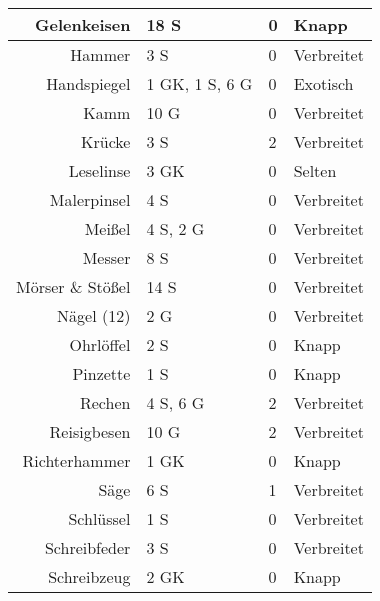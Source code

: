 \documentclass[a4paper, fontsize=9pt]{scrartcl}
\begin{document}
\begin{table}[ht!]
\begin{minipage}[c][\textheight][t]{.5\linewidth}
\begin{tabularx}{0.95\linewidth}{Rlll}
            Gelenkeisen         & 18 S           & 0           & Knapp               \\ \hline
            Hammer              & 3 S            & 0           & Verbreitet          \\ \hline
            Handspiegel         & 1 GK, 1 S, 6 G & 0           & Exotisch            \\ \hline
            Kamm                & 10 G           & 0           & Verbreitet          \\ \hline
            Krücke              & 3 S            & 2           & Verbreitet          \\ \hline
            Leselinse           & 3 GK           & 0           & Selten              \\ \hline
            Malerpinsel         & 4 S            & 0           & Verbreitet          \\ \hline
            Meißel              & 4 S, 2 G       & 0           & Verbreitet          \\ \hline
            Messer              & 8 S            & 0           & Verbreitet          \\ \hline
            Mörser \& Stößel    & 14 S           & 0           & Verbreitet          \\ \hline
            Nägel (12)          & 2 G            & 0           & Verbreitet          \\ \hline
            Ohrlöffel           & 2 S            & 0           & Knapp               \\ \hline
            Pinzette            & 1 S            & 0           & Knapp               \\ \hline
            Rechen              & 4 S, 6 G       & 2           & Verbreitet          \\ \hline
            Reisigbesen         & 10 G           & 2           & Verbreitet          \\ \hline
            Richterhammer       & 1 GK           & 0           & Knapp               \\ \hline
            Säge                & 6 S            & 1           & Verbreitet          \\ \hline
            Schlüssel           & 1 S            & 0           & Verbreitet          \\ \hline
            Schreibfeder        & 3 S            & 0           & Verbreitet          \\ \hline
            Schreibzeug         & 2 GK           & 0           & Knapp               \\ \hline

\end{tabularx}
\end{minipage}
\end{table}
\end{document}
